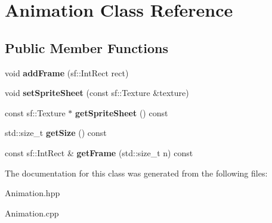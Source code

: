 \hypertarget{class_animation}{}\section{Animation Class Reference}
\label{class_animation}
\subsection*{Public Member Functions}
\begin{DoxyCompactItemize}
\item 
\mbox{\label{class_animation_a486ee5fa2d40ae90f227a19866998c91}} 
void {\bfseries add\+Frame} (sf\+::\+Int\+Rect rect)
\item 
\mbox{\label{class_animation_a2fb16f452a323d51a0104c0aa454cab3}} 
void {\bfseries set\+Sprite\+Sheet} (const sf\+::\+Texture \&texture)
\item 
\mbox{\label{class_animation_abf4f00f8b1657829583d7d92e71b93d1}} 
const sf\+::\+Texture $\ast$ {\bfseries get\+Sprite\+Sheet} () const
\item 
\mbox{\label{class_animation_ac6854dc96e9fc8ffd97feba43547c869}} 
std\+::size\+\_\+t {\bfseries get\+Size} () const
\item 
\mbox{\label{class_animation_a8cf30a3b19ba104eeb34b08f45cfabe2}} 
const sf\+::\+Int\+Rect \& {\bfseries get\+Frame} (std\+::size\+\_\+t n) const
\end{DoxyCompactItemize}


The documentation for this class was generated from the following files\+:\begin{DoxyCompactItemize}
\item 
Animation.\+hpp\item 
Animation.\+cpp\end{DoxyCompactItemize}
